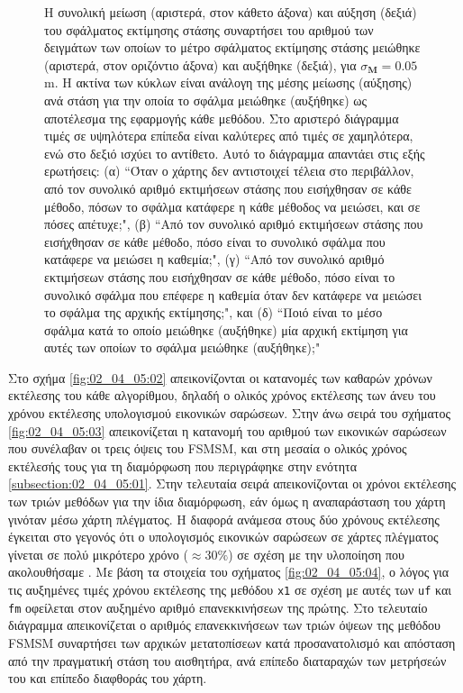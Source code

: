 \begin{figure}\vspace{3cm}%
  
  \vspace{1cm}
  \caption{\small Η συνολική μείωση (αριστερά, στον κάθετο άξονα) και αύξηση
           (δεξιά) του σφάλματος εκτίμησης στάσης συναρτήσει του αριθμού των
           δειγμάτων των οποίων το μέτρο σφάλματος εκτίμησης στάσης μειώθηκε
           (αριστερά, στον οριζόντιο άξονα) και αυξήθηκε (δεξιά), για
           $\sigma_{\bm{M}} = 0.05$ m. Η ακτίνα των κύκλων είναι ανάλογη της
           μέσης μείωσης (αύξησης) ανά στάση για την οποία το σφάλμα μειώθηκε
           (αυξήθηκε) ως αποτέλεσμα της εφαρμογής κάθε μεθόδου. Στο αριστερό
           διάγραμμα τιμές σε υψηλότερα επίπεδα είναι καλύτερες από τιμές σε
           χαμηλότερα, ενώ στο δεξιό ισχύει το αντίθετο. Αυτό το
           διάγραμμα απαντάει στις εξής ερωτήσεις: (α) ``Όταν ο χάρτης δεν
           αντιστοιχεί τέλεια στο περιβάλλον, από τον συνολικό αριθμό
           εκτιμήσεων στάσης που εισήχθησαν σε κάθε μέθοδο, πόσων το σφάλμα
           κατάφερε η κάθε μέθοδος να μειώσει, και σε πόσες απέτυχε;", (β)
           ``Από τον συνολικό αριθμό εκτιμήσεων στάσης που εισήχθησαν σε κάθε
           μέθοδο, πόσο είναι το συνολικό σφάλμα που κατάφερε να μειώσει η
           καθεμία;", (γ) ``Από τον συνολικό αριθμό εκτιμήσεων στάσης που
           εισήχθησαν σε κάθε μέθοδο, πόσο είναι το συνολικό σφάλμα που επέφερε
           η καθεμία όταν δεν κατάφερε να μειώσει το σφάλμα της αρχικής
           εκτίμησης;", και (δ) ``Ποιό είναι το μέσο σφάλμα κατά το οποίο
           μειώθηκε (αυξήθηκε) μία αρχική εκτίμηση για αυτές των οποίων το
           σφάλμα μειώθηκε (αυξήθηκε);"}
  \label{fig:02_04_05:01_circles_sm5}
\end{figure}

Στο σχήμα \ref{fig:02_04_05:02} απεικονίζονται οι κατανομές των καθαρών χρόνων
εκτέλεσης του κάθε αλγορίθμου, δηλαδή ο ολικός χρόνος εκτέλεσης των άνευ του
χρόνου εκτέλεσης υπολογισμού εικονικών σαρώσεων. Στην άνω σειρά του σχήματος
\ref{fig:02_04_05:03} απεικονίζεται η κατανομή του αριθμού των εικονικών
σαρώσεων που συνέλαβαν οι τρεις όψεις του FSMSM, και στη μεσαία ο ολικός χρόνος
εκτέλεσής τους για τη διαμόρφωση που περιγράφηκε στην ενότητα
\ref{subsection:02_04_05:01}. Στην τελευταία σειρά απεικονίζονται οι χρόνοι
εκτέλεσης των τριών μεθόδων για την ίδια διαμόρφωση, εάν όμως η αναπαράσταση του
χάρτη γινόταν μέσω χάρτη πλέγματος. Η διαφορά ανάμεσα στους δύο χρόνους
εκτέλεσης έγκειται στο γεγονός ότι ο υπολογισμός εικονικών σαρώσεων σε χάρτες
πλέγματος γίνεται σε πολύ μικρότερο χρόνο ($\approx 30\%$) σε σχέση με την
υλοποίηση που ακολουθήσαμε \cite{Walsh2018}. Με βάση τα στοιχεία του σχήματος
\ref{fig:02_04_05:04}, ο λόγος για τις αυξημένες τιμές χρόνου εκτέλεσης της
μεθόδου \texttt{x1} σε σχέση με αυτές των \texttt{uf} και \texttt{fm} οφείλεται
στον αυξημένο αριθμό επανεκκινήσεων της πρώτης. Στο τελευταίο διάγραμμα
απεικονίζεται ο αριθμός επανεκκινήσεων των τριών όψεων της μεθόδου FSMSM
συναρτήσει των αρχικών μετατοπίσεων κατά προσανατολισμό και απόσταση από
την πραγματική στάση του αισθητήρα, ανά επίπεδο διαταραχών των μετρήσεών του
και επίπεδο διαφθοράς του χάρτη.


